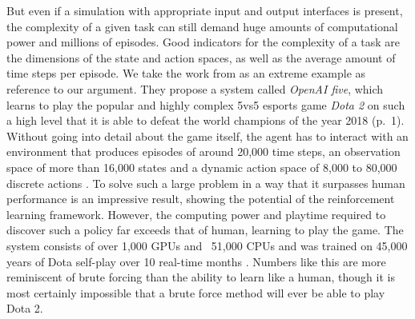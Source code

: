 \par
But even if a simulation with appropriate input and output interfaces is present, the complexity of a given task can still demand huge amounts of computational power and millions of episodes. Good indicators for the complexity of a task are the dimensions of the state and action spaces, as well as the average amount of time steps per episode. We take the work from \cite{berner2019dota} as an extreme example as reference to our argument. They propose a system called \textit{OpenAI five}, which learns to play the popular and highly complex 5vs5 esports game \textit{Dota 2} on such a high level that it is able to defeat the world champions of the year 2018 (p.~1). Without going into detail about the game itself, the agent has to interact with an environment that produces episodes of around 20,000 time steps, an observation space of more than 16,000 states and a dynamic action space of 8,000 to 80,000 discrete actions \cite[p.~3]{berner2019dota}. To solve such a large problem in a way that it surpasses human performance is an impressive result, showing the potential of the reinforcement learning framework. However, the computing power and playtime required to discover such a policy far exceeds that of human, learning to play the game. The system consists of over 1,000 GPUs and ~51,000 CPUs \cite[p.~3]{berner2019dota} and was trained on 45,000 years of Dota self-play over 10 real-time months \cite[]{OpenAI_dota}.
Numbers like this are more reminiscent of brute forcing than the ability to learn like a human, though it is most certainly impossible that a brute force method will ever be able to play Dota 2.